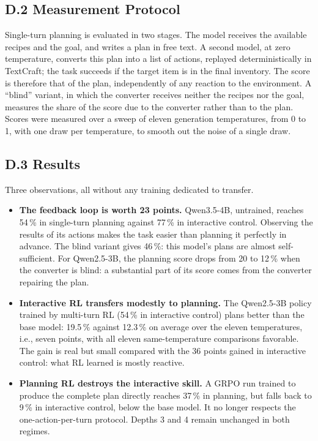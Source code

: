 \documentclass[11pt,a4paper]{article}
\begin{document}
\subsection*{D.2 Measurement Protocol}
Single-turn planning is evaluated in two stages. The model receives the available recipes and the goal, and writes a plan in free text. A second model, at zero temperature, converts this plan into a list of actions, replayed deterministically in TextCraft; the task succeeds if the target item is in the final inventory. The score is therefore that of the plan, independently of any reaction to the environment. A ``blind'' variant, in which the converter receives neither the recipes nor the goal, measures the share of the score due to the converter rather than to the plan. Scores were measured over a sweep of eleven generation temperatures, from 0 to 1, with one draw per temperature, to smooth out the noise of a single draw.

\subsection*{D.3 Results}
Three observations, all without any training dedicated to transfer.

\begin{itemize}
    \item \textbf{The feedback loop is worth 23 points.} Qwen3.5-4B, untrained, reaches 54\,\% in single-turn planning against 77\,\% in interactive control. Observing the results of its actions makes the task easier than planning it perfectly in advance. The blind variant gives 46\,\%: this model's plans are almost self-sufficient. For Qwen2.5-3B, the planning score drops from 20 to 12\,\% when the converter is blind: a substantial part of its score comes from the converter repairing the plan.
    \item \textbf{Interactive RL transfers modestly to planning.} The Qwen2.5-3B policy trained by multi-turn RL (54\,\% in interactive control) plans better than the base model: 19.5\,\% against 12.3\,\% on average over the eleven temperatures, i.e., seven points, with all eleven same-temperature comparisons favorable. The gain is real but small compared with the 36 points gained in interactive control: what RL learned is mostly reactive.
    \item \textbf{Planning RL destroys the interactive skill.} A GRPO run trained to produce the complete plan directly reaches 37\,\% in planning, but falls back to 9\,\% in interactive control, below the base model. It no longer respects the one-action-per-turn protocol. Depths 3 and 4 remain unchanged in both regimes.
\end{itemize}
\end{document}
